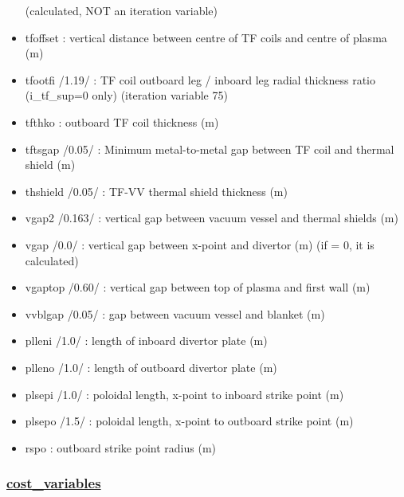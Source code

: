 \documentclass[]{article}
\begin{document}
\begin{itemize}
  (calculated, NOT an iteration variable)
\item
  tfoffset : vertical distance between centre of TF coils and centre of
  plasma (m)
\item
  tfootfi /1.19/ : TF coil outboard leg / inboard leg radial thickness
  ratio (i_tf_sup=0 only) (iteration variable 75)
\item
  tfthko : outboard TF coil thickness (m)
\item
  tftsgap /0.05/ : Minimum metal-to-metal gap between TF coil and
  thermal shield (m)
\item
  thshield /0.05/ : TF-VV thermal shield thickness (m)
\item
  vgap2 /0.163/ : vertical gap between vacuum vessel and thermal shields
  (m)
\item
  vgap /0.0/ : vertical gap between x-point and divertor (m) (if = 0, it
  is calculated)
\item
  vgaptop /0.60/ : vertical gap between top of plasma and first wall (m)
\item
  vvblgap /0.05/ : gap between vacuum vessel and blanket (m)
\item
  plleni /1.0/ : length of inboard divertor plate (m)
\item
  plleno /1.0/ : length of outboard divertor plate (m)
\item
  plsepi /1.0/ : poloidal length, x-point to inboard strike point (m)
\item
  plsepo /1.5/ : poloidal length, x-point to outboard strike point (m)
\item
  rspo : outboard strike point radius (m)
\end{itemize}

\hypertarget{cost_variables}{%
\subsubsection{\texorpdfstring{\href{cost_variables.html}{cost\_variables}}{cost\_variables}}\label{cost_variables}}
\end{document}
